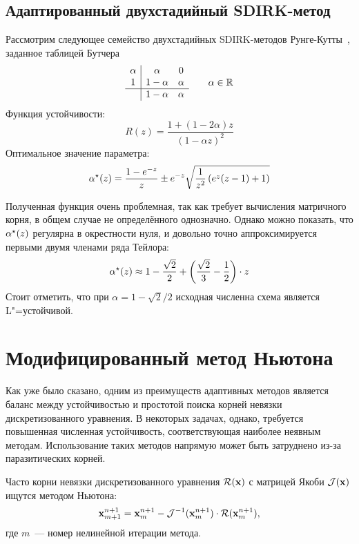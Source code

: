 \subsection{Адаптированный двухстадийный SDIRK-метод}
\label{subsection:exponential_fitting:two_stage_SDIRK}

Рассмотрим следующее семейство двухстадийных SDIRK-методов Рунге-Кутты~\cite{franko1997SDIRK},
заданное таблицей Бутчера
\[
    \begin{array}{c|cc}
        \alpha & \alpha & 0 \\
        1      & 1 - \alpha & \alpha \\
        \hline
         & 1 - \alpha & \alpha
    \end{array}
    \qquad
    \alpha \in \mathbb{R}
\]
Функция устойчивости:
\[
    R(z) = \frac{1 + (1 - 2 \alpha) z}{(1 - \alpha z)^2}
\]
Оптимальное значение параметра:
%
\begin{equation}
    \label{eq:two_stage_SDIRK:optimal_parameters}
    \alpha^\star(z) = \frac{1 - e^{-z}}{z} \pm e^{-z} \sqrt{\frac{1}{z^2} \left( e^z (z - 1) + 1 \right)}
\end{equation}

Полученная функция очень проблемная,
так как требует вычисления матричного корня,
в общем случае не определённого однозначно.
Однако можно показать, что $ \alpha^\star(z) $ регулярна в окрестности нуля,
и довольно точно аппроксимируется первыми двумя членами ряда Тейлора:
\[
    \alpha^\star(z) \approx 1 - \frac{\sqrt{2}}{2} + \left( \frac{\sqrt{2}}{3} - \frac{1}{2} \right) \cdot z
\]
Стоит отметить, что при $ \alpha = 1 - \sqrt{2} / 2 $ исходная численна схема является L"=устойчивой.


\section{Модифицированный метод Ньютона}
\label{section:methods:modified_Newton_iteration}

Как уже было сказано, одним из преимуществ адаптивных методов является баланс между устойчивостью
и простотой поиска корней невязки дискретизованного уравнения.
В некоторых задачах, однако, требуется повышенная численная устойчивость,
соответствующая наиболее неявным методам.
Использование таких методов напрямую может быть затруднено из-за паразитических корней.

Часто корни невязки дискретизованного уравнения $ \mathcal{R}(\mathbf{x}) $ с матрицей Якоби $ \mathcal{J}(\mathbf{x}) $
ищутся методом Ньютона:
%
\begin{equation}
    \label{eq:modified_Newton_iteration:Newton_method}
    \mathbf{x}_{m+1}^{n+1} = \mathbf{x}_m^{n+1} - \mathcal{J}^{-1}(\mathbf{x}_m^{n+1}) \cdot \mathcal{R}(\mathbf{x}_m^{n+1}),
\end{equation}
%
где $ m $~--- номер нелинейной итерации метода.
